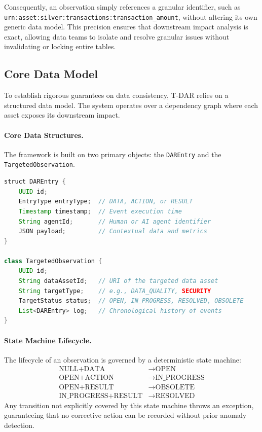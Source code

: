 \documentclass[11pt,a4paper]{article}
\begin{document}
Consequently, an observation simply references a granular identifier, such as \nolinkurl{urn:asset:silver:transactions:transaction_amount}, without altering its own generic data model. This precision ensures that downstream impact analysis is exact, allowing data teams to isolate and resolve granular issues without invalidating or locking entire tables.

\subsection{Core Data Model}
To establish rigorous guarantees on data consistency, T-DAR relies on a structured data model. The system operates over a dependency graph where each asset exposes its downstream impact.

\paragraph{Core Data Structures.}
The framework is built on two primary objects: the \texttt{DAREntry} and the \texttt{TargetedObservation}.

\noindent
\begin{minipage}{\linewidth}
\begin{lstlisting}[language=Java]
struct DAREntry {
    UUID id;
    EntryType entryType;  // DATA, ACTION, or RESULT
    Timestamp timestamp;  // Event execution time
    String agentId;       // Human or AI agent identifier
    JSON payload;         // Contextual data and metrics
}

class TargetedObservation {
    UUID id;
    String dataAssetId;   // URI of the targeted data asset
    String targetType;    // e.g., DATA_QUALITY, SECURITY
    TargetStatus status;  // OPEN, IN_PROGRESS, RESOLVED, OBSOLETE
    List<DAREntry> log;   // Chronological history of events
}
\end{lstlisting}
\end{minipage}

\paragraph{State Machine Lifecycle.}
The lifecycle of an observation is governed by a deterministic state machine:
\begin{align*}
    \text{NULL} + \text{DATA} &\longrightarrow \text{OPEN} \\
    \text{OPEN} + \text{ACTION} &\longrightarrow \text{IN\_PROGRESS} \\
    \text{OPEN} + \text{RESULT} &\longrightarrow \text{OBSOLETE} \\
    \text{IN\_PROGRESS} + \text{RESULT} &\longrightarrow \text{RESOLVED}
\end{align*}
Any transition not explicitly covered by this state machine throws an exception, guaranteeing that no corrective action can be recorded without prior anomaly detection.
\end{document}
